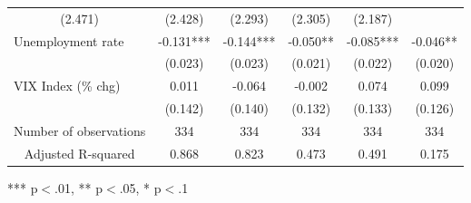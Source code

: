 \begin{table}[!h]
\begin{tabular}{llllll}
  \multicolumn{1}{|c}{(2.471)} &
  \multicolumn{1}{c}{(2.428)} &
  \multicolumn{1}{c}{(2.293)} &
  \multicolumn{1}{c}{(2.305)} &
  \multicolumn{1}{c}{(2.187)} \\
\multicolumn{1}{l}{Unemployment rate} &
  \multicolumn{1}{|c}{-0.131***} &
  \multicolumn{1}{c}{-0.144***} &
  \multicolumn{1}{c}{-0.050**} &
  \multicolumn{1}{c}{-0.085***} &
  \multicolumn{1}{c}{-0.046**} \\
\multicolumn{1}{l}{} &
  \multicolumn{1}{|c}{(0.023)} &
  \multicolumn{1}{c}{(0.023)} &
  \multicolumn{1}{c}{(0.021)} &
  \multicolumn{1}{c}{(0.022)} &
  \multicolumn{1}{c}{(0.020)} \\
\multicolumn{1}{l}{VIX Index (\% chg)} &
  \multicolumn{1}{|c}{0.011} &
  \multicolumn{1}{c}{-0.064} &
  \multicolumn{1}{c}{-0.002} &
  \multicolumn{1}{c}{0.074} &
  \multicolumn{1}{c}{0.099} \\
\multicolumn{1}{l}{} &
  \multicolumn{1}{|c}{(0.142)} &
  \multicolumn{1}{c}{(0.140)} &
  \multicolumn{1}{c}{(0.132)} &
  \multicolumn{1}{c}{(0.133)} &
  \multicolumn{1}{c}{(0.126)} \\
\multicolumn{1}{c}{Number of observations} &
  \multicolumn{1}{|c}{334} &
  \multicolumn{1}{c}{334} &
  \multicolumn{1}{c}{334} &
  \multicolumn{1}{c}{334} &
  \multicolumn{1}{c}{334} \\
\multicolumn{1}{c}{Adjusted R-squared} &
  \multicolumn{1}{|c}{0.868} &
  \multicolumn{1}{c}{0.823} &
  \multicolumn{1}{c}{0.473} &
  \multicolumn{1}{c}{0.491} &
  \multicolumn{1}{c}{0.175} \\
\cline{1-6}
\end{tabular}

\footnotesize{
*** p$<$.01, ** p$<$.05, * p$<$.1
}
\end{table}
